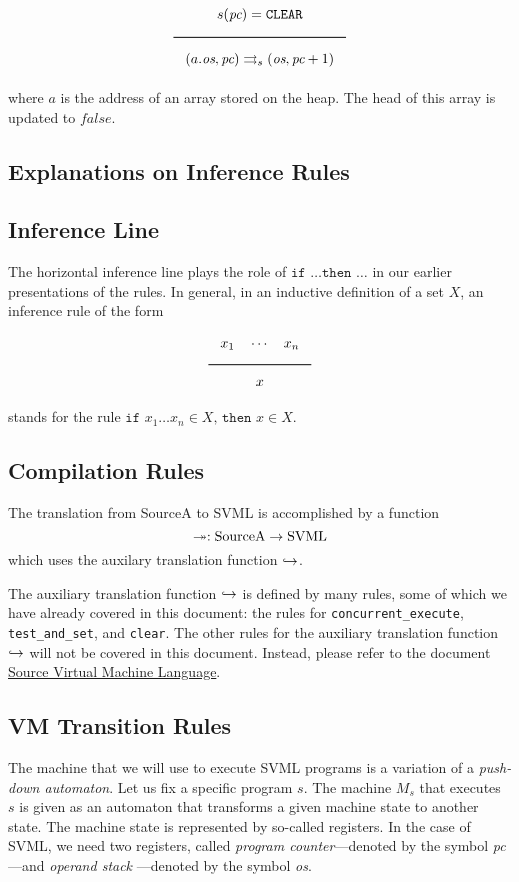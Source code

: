 $$\Rule{s(\textit{pc}) = \texttt{CLEAR}}{(a.\textit{os},\textit{pc}) \transition (\textit{os},\textit{pc} + 1)}$$
where \(a\) is the address of an array stored on the heap. The head of this array is updated to \(\textit{false}\).

\begin{appendices}
\section{Explanations on Inference Rules}
\label{sec:org10e3758}

\subsection{Inference Line}
\label{sec:orgce78d8d}
The horizontal inference line plays the role of \(\texttt{if } \ldots \texttt{then } \ldots\) in our earlier presentations of the rules. In general, in an inductive definition of a set \(X\), an inference rule of the form
$$\Rule{x_1 \quad \cdots \quad x_n}{x}$$
stands for the rule \(\texttt{if } x_1 \ldots x_n\in X \texttt{, then }x \in X\).

\subsection{Compilation Rules}
\label{sec:orgcf76b4e}
The translation from SourceA to SVML is accomplished by a function
$$\twoheadrightarrow: \textrm{SourceA} \rightarrow \textrm{SVML}$$
which uses the auxilary translation function \(\hookrightarrow\).

The auxiliary translation function \(\hookrightarrow\) is defined by many rules, some of which we have already covered in this document: the rules for \texttt{concurrent\_execute}, \texttt{test\_and\_set}, and \texttt{clear}.
The other rules for the auxiliary translation function \(\hookrightarrow\) will not be covered in this document. Instead, please refer to the document \href{svml-spec.pdf}{Source Virtual Machine Language}.

\subsection{VM Transition Rules}
\label{sec:orgeeb069e}
The machine that we will use to execute SVML programs is a variation of a \emph{push-down automaton}. Let us fix a specific program \(s\). The machine \(M_s\) that executes \(s\) is given as an automaton that transforms a given machine state to another state. The machine state is represented by so-called registers. In the case of SVML, we need two registers, called \emph{program counter}---denoted by the symbol \textit{pc}---and \emph{operand stack} ---denoted by the symbol \textit{os}.


\end{appendices}
